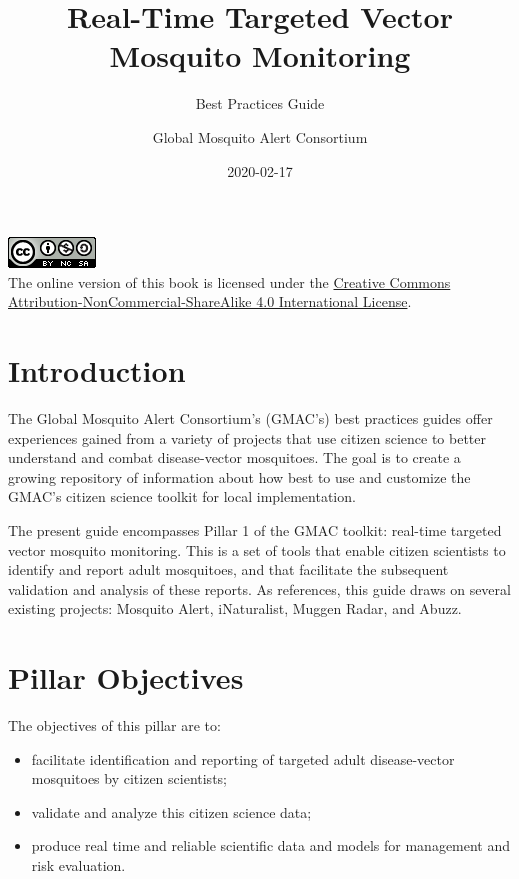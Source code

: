 \documentclass[]{article}
\title{Real-Time Targeted Vector Mosquito Monitoring}
\subtitle{Best Practices Guide}
\author{Global Mosquito Alert Consortium}
\date{2020-02-17}
\providecommand{\tightlist}{%
  \setlength{\itemsep}{0pt}\setlength{\parskip}{0pt}}
\begin{document}
\maketitle

{
\setcounter{tocdepth}{2}
\tableofcontents
}
\hypertarget{section}{%
\section*{}\label{section}}

\includegraphics{images/by-nc-sa.png}\\
The online version of this book is licensed under the \href{http://creativecommons.org/licenses/by-nc-sa/4.0/}{Creative Commons Attribution-NonCommercial-ShareAlike 4.0 International License}.

\hypertarget{intro}{%
\section{Introduction}\label{intro}}

The Global Mosquito Alert Consortium's (GMAC's) best practices guides offer experiences gained from a variety of projects that use citizen science to better understand and combat disease-vector mosquitoes. The goal is to create a growing repository of information about how best to use and customize the GMAC's citizen science toolkit for local implementation.

The present guide encompasses Pillar 1 of the GMAC toolkit: real-time targeted vector mosquito monitoring. This is a set of tools that enable citizen scientists to identify and report adult mosquitoes, and that facilitate the subsequent validation and analysis of these reports. As references, this guide draws on several existing projects: Mosquito Alert, iNaturalist, Muggen Radar, and Abuzz.

\hypertarget{objectives}{%
\section{Pillar Objectives}\label{objectives}}

The objectives of this pillar are to:

\begin{itemize}
\tightlist
\item
  facilitate identification and reporting of targeted adult disease-vector mosquitoes by citizen scientists;
\item
  validate and analyze this citizen science data;
\item
  produce real time and reliable scientific data and models for management and risk evaluation.
\end{itemize}
\end{document}
